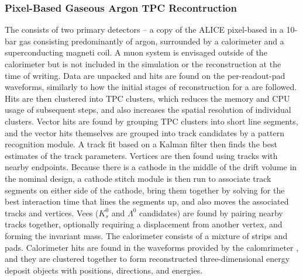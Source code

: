 \documentclass[../main-v1.tex]{subfiles}
\begin{document}
\subsubsection{Pixel-Based Gaseous Argon TPC Recontruction}
\label{sec:algo:reco:gartpc:pixels}

The  consists of two primary detectors -- a copy of the ALICE pixel-based  in a 10-bar gas consisting predominantly of argon, surrounded by a calorimeter and a superconducting magneti coil.  A muon system is envisaged outside of the calorimeter but is not included in the simulation or the reconstruction at the time of writing.  Data are unpacked and hits are found on the per-readout-pad waveforms, similarly to how the initial stages of reconstruction for a  are followed.  Hits are then clustered into TPC clusters, which reduces the memory and CPU usage of subsequent steps, and also increases the spatial resolution of individual clusters.  Vector hits are found by grouping TPC clusters into short line segments, and the vector hits themselves are grouped into track candidates by a pattern recognition module.  A track fit based on a Kalman filter then finds the best estimates of the track parameters.  Vertices are then found using tracks with nearby endpoints.  Because there is a cathode in the middle of the drift volume in the nominal design, a cathode stitch module is then run to associate track segments on either side of the cathode, bring them together by solving for the best interaction time that lines the segments up, and also moves the associated tracks and vertices.  Vees ($K^0_s$ and
$\Lambda^0$ candidates) are found by pairing nearby tracks together, optionally requiring a displacement from another vertex, and forming the invariant mass.  The calorimeter consists of a mixture of strips and pads.  Calorimeter hits are found in the  waveforms provided by the calomrimeter , and they are clustered together to form reconstructed three-dimensional energy deposit objects with positions, directions, and energies.
\end{document}
